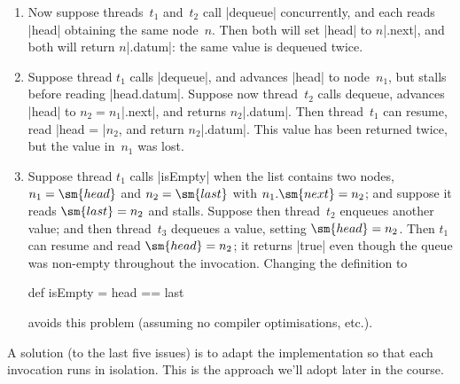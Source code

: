 \begin{answer}
\begin{enumerate}

\item Now suppose threads~$t_1$ and~$t_2$ call |dequeue| concurrently, and
  each reads |head| obtaining the same node~$n$.  Then both will set |head| to
  $n$|.next|, and both will return $n$|.datum|: the same value is dequeued
  twice.


\item Suppose thread $t_1$ calls |dequeue|, and advances |head| to node~$n_1$,
  but stalls before reading |head.datum|.  Suppose now thread~$t_2$ calls
  dequeue, advances |head| to $n_2 = n_1$|.next|, and returns $n_2$|.datum|.
  Then thread~$t_1$ can resume, read |head = |$n_2$, and
  return $n_2$|.datum|.  This value has been returned twice, but the value
  in~$n_1$ was lost. 

\item Suppose thread $t_1$ calls |isEmpty| when the list contains two nodes,
  $n_1 = \sm{head}$ and $n_2 = \sm{last}$ with $n_1.\sm{next} = n_2$; and
  suppose it reads $\sm{last} = n_2$ and stalls.  Suppose then thread~$t_2$
  enqueues another value; and then thread~$t_3$ dequeues a value, setting
  $\sm{head} = n_2$.  Then $t_1$ can resume and read $\sm{head} = n_2$; it
  returns |true| even though the queue was non-empty throughout the
  invocation. 
%
  Changing the definition to
  \begin{scala}
  def isEmpty = head == last
  \end{scala}%
  avoids this problem (assuming no compiler optimisations, etc.).
\end{enumerate}

A solution (to the last five issues) is to adapt the implementation so that
each invocation runs in isolation.  This is the approach we'll adopt later in
the course.  
\end{answer}
